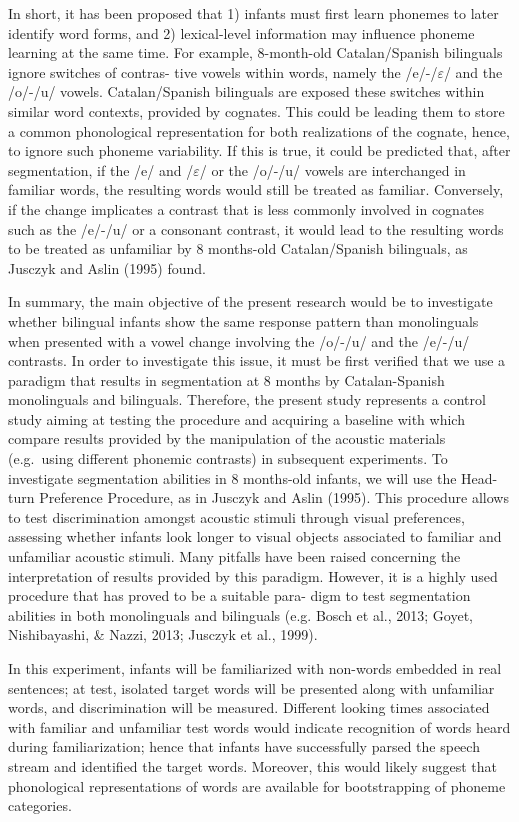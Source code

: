 \documentclass[man,floatsintext]{apa6}
\begin{document}
In short, it has been proposed that 1) infants must first learn phonemes to later identify word forms, and 2) lexical-level information may influence phoneme learning at the same time. For example, 8-month-old Catalan/Spanish bilinguals ignore switches of contras- tive vowels within words, namely the /e/-/\(\varepsilon\)/ and the /o/-/u/ vowels. Catalan/Spanish bilinguals are exposed these switches within similar word contexts, provided by cognates. This could be leading them to store a common phonological representation for both realizations of the cognate, hence, to ignore such phoneme variability. If this is true, it could be predicted that, after segmentation, if the /e/ and /\(\varepsilon\)/ or the /o/-/u/ vowels are interchanged in familiar words, the resulting words would still be treated as familiar. Conversely, if the change implicates a contrast that is less commonly involved in cognates such as the /e/-/u/ or a consonant contrast, it would lead to the resulting words to be treated as unfamiliar by 8 months-old Catalan/Spanish bilinguals, as Jusczyk and Aslin (1995) found.

In summary, the main objective of the present research would be to investigate whether bilingual infants show the same response pattern than monolinguals when presented with a vowel change involving the /o/-/u/ and the /e/-/u/ contrasts. In order to investigate this issue, it must be first verified that we use a paradigm that results in segmentation at 8 months by Catalan-Spanish monolinguals and bilinguals. Therefore, the present study represents a control study aiming at testing the procedure and acquiring a baseline with which compare results provided by the manipulation of the acoustic materials (e.g.~using different phonemic contrasts) in subsequent experiments. To investigate segmentation abilities in 8 months-old infants, we will use the Head-turn Preference Procedure, as in Jusczyk and Aslin (1995). This procedure allows to test discrimination amongst acoustic stimuli through visual preferences, assessing whether infants look longer to visual objects associated to familiar and unfamiliar acoustic stimuli. Many pitfalls have been raised concerning the interpretation of results provided by this paradigm. However, it is a highly used procedure that has proved to be a suitable para- digm to test segmentation abilities in both monolinguals and bilinguals (e.g. Bosch et al., 2013; Goyet, Nishibayashi, \& Nazzi, 2013; Jusczyk et al., 1999).

In this experiment, infants will be familiarized with non-words embedded in real sentences; at test, isolated target words will be presented along with unfamiliar words, and discrimination will be measured. Different looking times associated with familiar and unfamiliar test words would indicate recognition of words heard during familiarization; hence that infants have successfully parsed the speech stream and identified the target words. Moreover, this would likely suggest that phonological representations of words are available for bootstrapping of phoneme categories.
\end{document}
